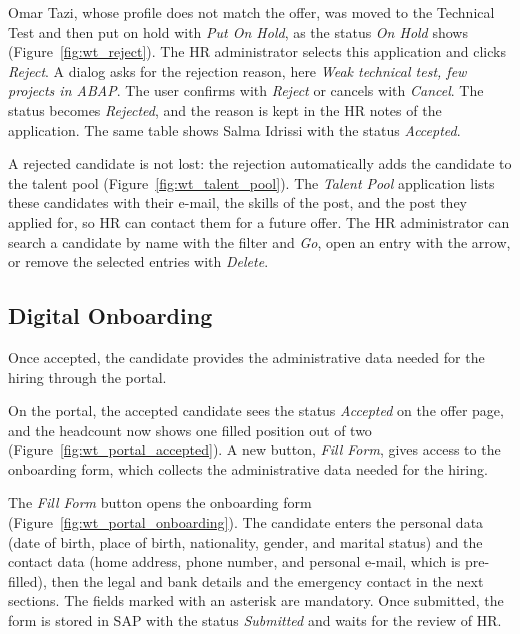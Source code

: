 
Omar Tazi, whose profile does not match the offer, was moved to the Technical Test and then put on hold with \emph{Put On Hold}, as the status \emph{On Hold} shows (Figure~\ref{fig:wt_reject}). The HR administrator selects this application and clicks \emph{Reject}. A dialog asks for the rejection reason, here \emph{Weak technical test, few projects in ABAP}. The user confirms with \emph{Reject} or cancels with \emph{Cancel}. The status becomes \emph{Rejected}, and the reason is kept in the HR notes of the application. The same table shows Salma Idrissi with the status \emph{Accepted}.


A rejected candidate is not lost: the rejection automatically adds the candidate to the talent pool (Figure~\ref{fig:wt_talent_pool}). The \emph{Talent Pool} application lists these candidates with their e-mail, the skills of the post, and the post they applied for, so HR can contact them for a future offer. The HR administrator can search a candidate by name with the filter and \emph{Go}, open an entry with the arrow, or remove the selected entries with \emph{Delete}.

\subsection{Digital Onboarding}
\label{subsec:wt_onboarding}

Once accepted, the candidate provides the administrative data needed for the hiring through the portal.


On the portal, the accepted candidate sees the status \emph{Accepted} on the offer page, and the headcount now shows one filled position out of two (Figure~\ref{fig:wt_portal_accepted}). A new button, \emph{Fill Form}, gives access to the onboarding form, which collects the administrative data needed for the hiring.


The \emph{Fill Form} button opens the onboarding form (Figure~\ref{fig:wt_portal_onboarding}). The candidate enters the personal data (date of birth, place of birth, nationality, gender, and marital status) and the contact data (home address, phone number, and personal e-mail, which is pre-filled), then the legal and bank details and the emergency contact in the next sections. The fields marked with an asterisk are mandatory. Once submitted, the form is stored in SAP with the status \emph{Submitted} and waits for the review of HR.

